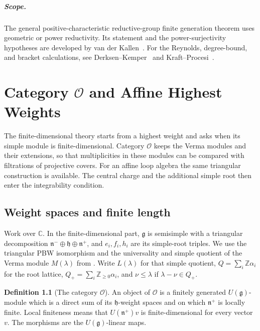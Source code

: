 \documentclass[11pt,oneside,openany]{book}
\theoremstyle{definition}
\newtheorem{definition}[theorem]{Definition}
\theoremstyle{remark}
\begin{document}
\paragraph{Scope.}
The general positive-characteristic reductive-group finite
generation theorem uses geometric or power reductivity. Its
statement and the power-surjectivity hypotheses are developed
by van der Kallen~\cite[Theorem 8]{vdk}. For the Reynolds,
degree-bound, and bracket calculations, see
Derksen--Kemper~\cite[Sections 2.2, 3.1--3.2 and 4.5]{derksen}
and Kraft--Procesi~\cite[Sections 1.6 and 8.4]{kraft-procesi}.
\chapter[Category O and Affine Highest Weights]{Category \(\mathcal O\) and Affine Highest Weights}
\label{ch:category-o}

The finite-dimensional theory starts from a highest weight and asks
when its simple module is finite-dimensional. Category \(\mathcal O\)
keeps the Verma modules and their extensions, so that multiplicities
in these modules can be compared with filtrations of projective covers.
For an affine loop algebra the same triangular construction is available.
The central charge and the additional simple root then enter the
integrability condition.

\section{Weight spaces and finite length}

Work over \(\mathbb C\). In the finite-dimensional part,
\(\mathfrak g\) is semisimple with a triangular decomposition
\(\mathfrak n^-\oplus\mathfrak h\oplus\mathfrak n^+\), and
\(e_i,f_i,h_i\) are its simple-root triples. We use the triangular
PBW isomorphism and the universality and simple quotient of the
Verma module \(M(\lambda)\) from \cite[Results G01--G03, PDF
pp.~43--44]{mg-lie}. Write \(L(\lambda)\) for that simple quotient,
\(Q=\sum_i\mathbb Z\alpha_i\) for the root lattice,
\(Q_+=\sum_i\mathbb Z_{\ge0}\alpha_i\), and \(\nu\le\lambda\) if
\(\lambda-\nu\in Q_+\).

\begin{definition}[The category \(\mathcal O\)]
\label{res:LO01}
An object of \(\mathcal O\) is a finitely generated \(U(\mathfrak g)\)-module
which is a direct sum of its \(\mathfrak h\)-weight spaces and on which
\(\mathfrak n^+\) is locally finite. Local finiteness means that
\(U(\mathfrak n^+)v\) is finite-dimensional for every vector \(v\).
The morphisms are the \(U(\mathfrak g)\)-linear maps.
\end{definition}
\end{document}

